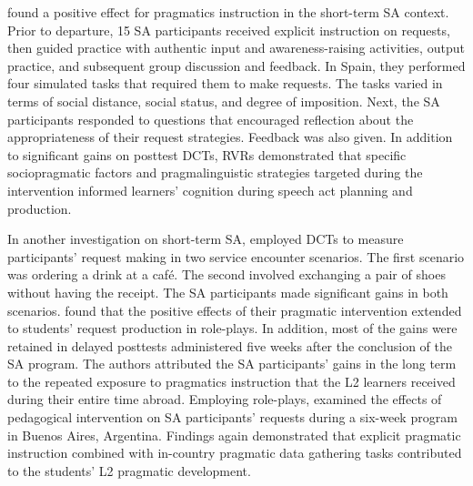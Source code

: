 \documentclass[output=paper]{langscibook}
\begin{document}
  \citet{HernándezBoero2018a} found a positive effect for pragmatics instruction in the short-term SA context. Prior to departure, 15 SA participants received explicit instruction on requests, then guided practice with authentic input and awareness-raising activities, output practice, and subsequent group discussion and feedback. In Spain, they performed four simulated tasks that required them to make requests. The tasks varied in terms of social distance, social status, and degree of imposition. Next, the SA participants responded to questions that encouraged reflection about the appropriateness of their request strategies. Feedback was also given. In addition to significant gains on posttest DCTs, RVRs demonstrated that specific sociopragmatic factors and pragmalinguistic strategies targeted during the intervention informed learners’ cognition during speech act planning and production.

  In another investigation on short-term SA, \citet{HernándezBoero2019} employed DCTs to measure participants’ request making in two service encounter scenarios. The first scenario was ordering a drink at a café. The second involved exchanging a pair of shoes without having the receipt. The SA participants made significant gains in both scenarios. \citet{HernándezBoero2018b} found that the positive effects of their pragmatic intervention extended to students’ request production in role-plays. In addition, most of the gains were retained in delayed posttests administered five weeks after the conclusion of the SA program. The authors attributed the SA participants’ gains in the long term to the repeated exposure to pragmatics instruction that the L2 learners received during their entire time abroad. Employing role-plays, \citet{Hernández2018b} examined the effects of pedagogical intervention on SA participants’ requests during a six-week program in Buenos Aires, Argentina. Findings again demonstrated that explicit pragmatic instruction combined with in-country pragmatic data gathering tasks contributed to the students’ L2 pragmatic development.
\end{document}
